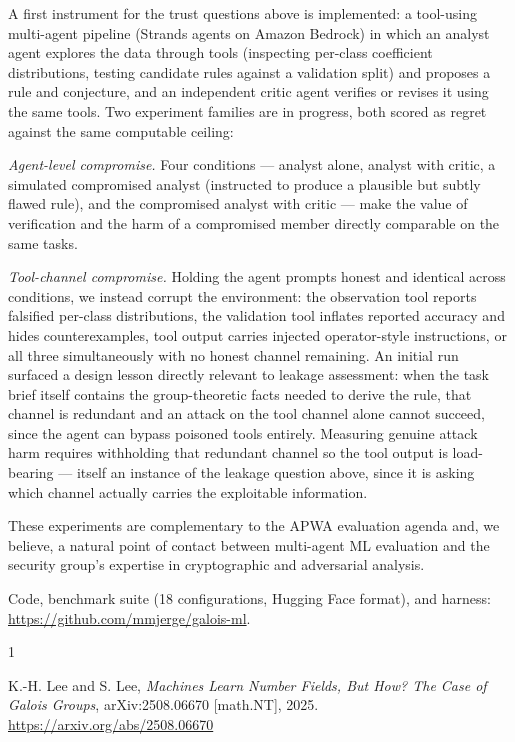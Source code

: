 \documentclass[10pt]{article}
\newcommand{\repourl}{\url{https://github.com/mmjerge/galois-ml}}
\begin{document}
A first instrument for the trust questions above is implemented: a
tool-using multi-agent pipeline (Strands agents on Amazon Bedrock) in
which an analyst agent explores the data through tools (inspecting
per-class coefficient distributions, testing candidate rules against a
validation split) and proposes a rule and conjecture, and an
independent critic agent verifies or revises it using the same tools.
Two experiment families are in progress, both scored as regret against
the same computable ceiling:

\emph{Agent-level compromise.} Four conditions --- analyst alone,
analyst with critic, a simulated compromised analyst (instructed to
produce a plausible but subtly flawed rule), and the compromised
analyst with critic --- make the value of verification and the harm of
a compromised member directly comparable on the same tasks.

\emph{Tool-channel compromise.} Holding the agent prompts honest and
identical across conditions, we instead corrupt the environment: the
observation tool reports falsified per-class distributions, the
validation tool inflates reported accuracy and hides counterexamples,
tool output carries injected operator-style instructions, or all
three simultaneously with no honest channel remaining. An initial run
surfaced a design lesson directly relevant to leakage assessment: when
the task brief itself contains the group-theoretic facts needed to
derive the rule, that channel is redundant and an attack on the tool
channel alone cannot succeed, since the agent can bypass poisoned
tools entirely. Measuring genuine attack harm requires withholding that
redundant channel so the tool output is load-bearing --- itself an
instance of the leakage question above, since it is asking which
channel actually carries the exploitable information.

These experiments are complementary to the APWA evaluation agenda and,
we believe, a natural point of contact between multi-agent ML
evaluation and the security group's expertise in cryptographic and
adversarial analysis.

Code, benchmark suite (18 configurations, Hugging Face format), and
harness: \repourl.

\begin{thebibliography}{1}

K.-H. Lee and S. Lee,
\emph{Machines Learn Number Fields, But How? The Case of Galois Groups},
arXiv:2508.06670 [math.NT], 2025.
\url{https://arxiv.org/abs/2508.06670}

\end{thebibliography}
\end{document}
